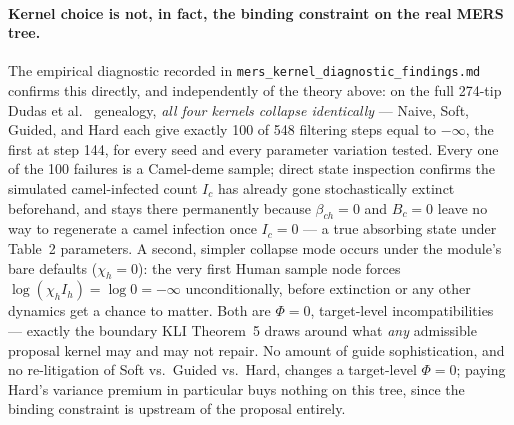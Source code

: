 \documentclass[11pt]{article}
\theoremstyle{plain}
\begin{document}
\paragraph{Kernel choice is not, in fact, the binding constraint on the real MERS tree.} The
empirical diagnostic recorded in \texttt{mers\_kernel\_diagnostic\_findings.md} confirms this
directly, and independently of the theory above: on the full 274-tip Dudas et al.\ \cite{Dudas}
genealogy, \emph{all four kernels collapse identically} --- Naive, Soft, Guided, and Hard each give
exactly 100 of 548 filtering steps equal to $-\infty$, the first at step 144, for every seed and
every parameter variation tested. Every one of the 100 failures is a Camel-deme sample; direct
state inspection confirms the simulated camel-infected count $I_c$ has already gone stochastically
extinct beforehand, and stays there permanently because $\beta_{ch}=0$ and $B_c=0$ leave no way to
regenerate a camel infection once $I_c=0$ --- a true absorbing state under Table~2 parameters. A
second, simpler collapse mode occurs under the module's bare defaults ($\chi_h=0$): the very first
Human sample node forces $\log(\chi_h I_h)=\log 0=-\infty$ unconditionally, before extinction or
any other dynamics get a chance to matter. Both are $\Phi=0$, target-level incompatibilities ---
exactly the boundary KLI Theorem~5 draws around what \emph{any} admissible proposal kernel may and
may not repair. No amount of guide sophistication, and no re-litigation of Soft vs.\ Guided vs.\
Hard, changes a target-level $\Phi=0$; paying Hard's variance premium in particular buys nothing on
this tree, since the binding constraint is upstream of the proposal entirely.
\end{document}

